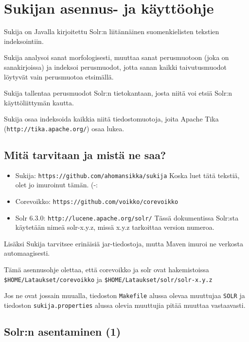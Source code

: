 \documentclass[12pt]{article}
\begin{document}
\pagestyle{fancy}
\setlength{\parindent}{0pt}
\setlength{\parskip}{1ex plus 0.5ex minus 0.2ex}
\section*{Sukijan asennus- ja käyttöohje}


Sukija on Javalla kirjoitettu Solr:n liitännäinen suomenkielisten
tekstien indeksointiin.

Sukija analysoi sanat morfologisesti, muuttaa sanat perusmuotoon (joka
on sanakirjoissa) ja indeksoi perusmuodot, jotta sanan kaikki
taivutusmuodot löytyvät vain perusmuotoa etsimällä.

Sukija tallentaa perusmuodot Solr:n tietokantaan, josta niitä voi
etsiä Solr:n käyttöliittymän kautta.

Sukija osaa indeksoida kaikkia niitä tiedostomuotoja, joita Apache
Tika (\verb=http://tika.apache.org/=) osaa lukea.

\subsection*{Mitä tarvitaan ja mistä ne saa?}

\begin{itemize}
\item Sukija:
      \verb=https://github.com/ahomansikka/sukija=
      Koska luet tätä tekstiä, olet jo imuroinut tämän. (-:

\item Corevoikko:
      \verb=https://github.com/voikko/corevoikko=

\item Solr 6.3.0:
      \verb=http://lucene.apache.org/solr/=
      Tässä dokumentissa Solr:sta käytetään nimeä solr-x.y.z,
      missä x.y.z tarkoittaa version numeroa.
\end{itemize}


Lisäksi Sukija tarvitsee erinäisiä jar-tiedostoja, mutta Maven imuroi
ne verkosta automaagisesti.

Tämä asennusohje olettaa, että corevoikko ja solr ovat hakemistoissa
\verb=$HOME/Lataukset/corevoikko= ja
\verb=$HOME/Lataukset/solr/solr-x.y.z=

Jos ne ovat jossain muualla, tiedoston \verb=Makefile= alussa olevaa
muuttujaa \verb=SOLR= ja tiedoston \verb=sukija.properties= alussa
olevia muuttujia pitää muuttaa vastaavasti.


\subsection*{Solr:n asentaminen (1)}
\end{document}
